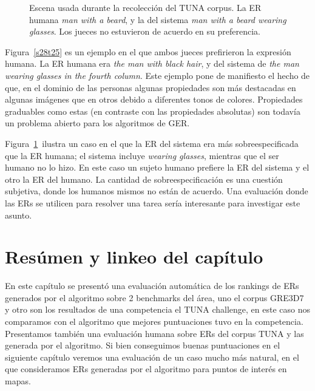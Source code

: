 \begin{figure}[h]
\begin{minipage}{0.48\linewidth}
\vspace*{-.3cm}
\caption{Escena usada durante la recolecci\'on del TUNA corpus. La ER humana \emph{man with a beard},  y la del sistema \emph{man with a beard wearing glasses}. Los jueces no estuvieron de acuerdo en su preferencia.}
\label{s307t21}
\end{minipage}
\end{figure}

Figura~\ref{s28t25} es un ejemplo en el que ambos jueces prefirieron la expresi\'on humana. La ER humana era {\it the man with black hair}, y del sistema de {\it the man wearing glasses in the fourth column}. Este ejemplo pone de manifiesto el hecho de que, en el dominio de las personas algunas propiedades son m\'as destacadas en algunas im\'agenes que en otros debido a diferentes tonos de colores. Propiedades graduables como estas (en contraste con las propiedades absolutas) son todav\'{i}a un problema abierto para los algoritmos de GER.

Figura~\ref{s307t21}~ilustra un caso en el que la ER del sistema era m\'as sobreespecificada que la ER humana; el sistema incluye {\it wearing glasses}, mientras que el ser humano no lo hizo. En este caso un sujeto humano prefiere la ER del sistema y el otro la ER del humano. La cantidad de sobreespecificaci\'on es una cuesti\'on subjetiva, donde los humanos mismos no est\'an de acuerdo. Una evaluaci\'on donde las ERs se utilicen para resolver una tarea ser\'{i}a interesante para investigar este asunto.

\section{Res\'umen y linkeo del cap\'itulo}

En este cap\'itulo se present\'o una evaluaci\'on autom\'atica de los rankings de ERs generados por el algoritmo sobre 2 benchmarks del \'area, uno el corpus GRE3D7 y otro son los resultados de una competencia el TUNA challenge, en este caso nos comparamos con el algoritmo que mejores puntuaciones tuvo en la competencia. Presentamos tambi\'en una evaluaci\'on humana sobre ERs del corpus TUNA y las generada por el algoritmo. Si bien conseguimos buenas puntuaciones en el siguiente cap\'itulo veremos una evaluaci\'on de un caso mucho m\'as natural, en el que consideramos ERs generadas por el algoritmo para puntos de inter\'es en mapas. 
